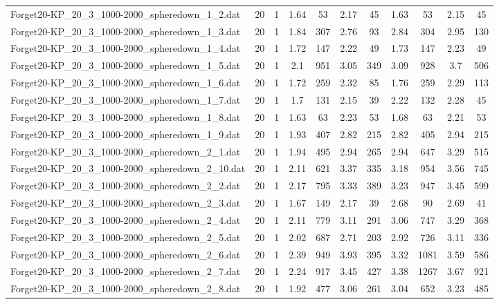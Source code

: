 \begin{table}[!ht]
\begin{tabular}{lcccccccccc}
Forget20-KP\_20\_3\_1000-2000\_spheredown\_1\_2.dat & 20 & 1 & 1.64 & 53 & 2.17 & 45 & 1.63 & 53 & 2.15 & 45 \\
Forget20-KP\_20\_3\_1000-2000\_spheredown\_1\_3.dat & 20 & 1 & 1.84 & 307 & 2.76 & 93 & 2.84 & 304 & 2.95 & 130 \\
Forget20-KP\_20\_3\_1000-2000\_spheredown\_1\_4.dat & 20 & 1 & 1.72 & 147 & 2.22 & 49 & 1.73 & 147 & 2.23 & 49 \\
Forget20-KP\_20\_3\_1000-2000\_spheredown\_1\_5.dat & 20 & 1 & 2.1 & 951 & 3.05 & 349 & 3.09 & 928 & 3.7 & 506 \\
Forget20-KP\_20\_3\_1000-2000\_spheredown\_1\_6.dat & 20 & 1 & 1.72 & 259 & 2.32 & 85 & 1.76 & 259 & 2.29 & 113 \\
Forget20-KP\_20\_3\_1000-2000\_spheredown\_1\_7.dat & 20 & 1 & 1.7 & 131 & 2.15 & 39 & 2.22 & 132 & 2.28 & 45 \\
Forget20-KP\_20\_3\_1000-2000\_spheredown\_1\_8.dat & 20 & 1 & 1.63 & 63 & 2.23 & 53 & 1.68 & 63 & 2.21 & 53 \\
Forget20-KP\_20\_3\_1000-2000\_spheredown\_1\_9.dat & 20 & 1 & 1.93 & 407 & 2.82 & 215 & 2.82 & 405 & 2.94 & 215 \\
Forget20-KP\_20\_3\_1000-2000\_spheredown\_2\_1.dat & 20 & 1 & 1.94 & 495 & 2.94 & 265 & 2.94 & 647 & 3.29 & 515 \\
Forget20-KP\_20\_3\_1000-2000\_spheredown\_2\_10.dat & 20 & 1 & 2.11 & 621 & 3.37 & 335 & 3.18 & 954 & 3.56 & 745 \\
Forget20-KP\_20\_3\_1000-2000\_spheredown\_2\_2.dat & 20 & 1 & 2.17 & 795 & 3.33 & 389 & 3.23 & 947 & 3.45 & 599 \\
Forget20-KP\_20\_3\_1000-2000\_spheredown\_2\_3.dat & 20 & 1 & 1.67 & 149 & 2.17 & 39 & 2.68 & 90 & 2.69 & 41 \\
Forget20-KP\_20\_3\_1000-2000\_spheredown\_2\_4.dat & 20 & 1 & 2.11 & 779 & 3.11 & 291 & 3.06 & 747 & 3.29 & 368 \\
Forget20-KP\_20\_3\_1000-2000\_spheredown\_2\_5.dat & 20 & 1 & 2.02 & 687 & 2.71 & 203 & 2.92 & 726 & 3.11 & 336 \\
Forget20-KP\_20\_3\_1000-2000\_spheredown\_2\_6.dat & 20 & 1 & 2.39 & 949 & 3.93 & 395 & 3.32 & 1081 & 3.59 & 586 \\
Forget20-KP\_20\_3\_1000-2000\_spheredown\_2\_7.dat & 20 & 1 & 2.24 & 917 & 3.45 & 427 & 3.38 & 1267 & 3.67 & 921 \\
Forget20-KP\_20\_3\_1000-2000\_spheredown\_2\_8.dat & 20 & 1 & 1.92 & 477 & 3.06 & 261 & 3.04 & 652 & 3.23 & 485 \\

\end{tabular}
\end{table}
